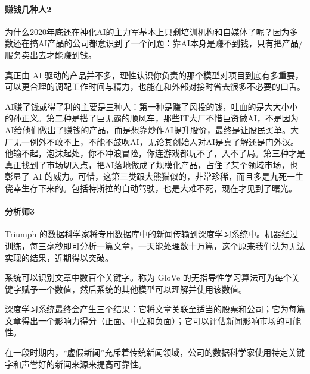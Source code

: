 \documentclass[letterpaper,11pt,english]{sphinxmanual}
\begin{document}
\paragraph{赚钱几种人2\sphinxfootnotemark[107]}
\label{\detokenize{chapter_introduction/money:id4}}%
\begin{footnotetext}[107]\sphinxAtStartFootnote
{}
%
\end{footnotetext}\ignorespaces 
为什么2020年底还在神化AI的主力军基本上只剩培训机构和自媒体了呢？因为多数还在搞AI产品的公司都意识到了一个问题：靠AI本身是赚不到钱，只有把产品/服务卖出去才能赚到钱。

真正由 AI
驱动的产品并不多，理性认识你负责的那个模型对项目到底有多重要，可以更合理的调配工作时间与精力，也能在和外部对接时省去很多不必要的口舌。

AI赚了钱或得了利的主要是三种人：第一种是赚了风投的钱，吐血的是大大小小的孙正义。第二种是搭了巨无霸的顺风车，那些IT大厂不惜巨资做AI，不是因为AI给他们做出了赚钱的产品，而是想靠炒作AI提升股价，最终是让股民买单。大厂无一例外不敢不上，不能不鼓吹AI，无论其创始人对AI是真了解还是门外汉。他输不起，泡沫起处，你不冲浪冒险，你连游戏都玩不了，入不了局。第三种才是真正找到了市场切入点，把AI落地做成了规模化产品，占住了某个领域市场，也彰显了
AI
的威力。可惜，这第三类跟大熊猫似的，非常珍稀，而且多是九死一生侥幸生存下来的。包括特斯拉的自动驾驶，也是大难不死，现在才见到了曙光。


\paragraph{分析师3\sphinxfootnotemark[108]}
\label{\detokenize{chapter_introduction/money:id5}}%
\begin{footnotetext}[108]\sphinxAtStartFootnote
{}
%
\end{footnotetext}\ignorespaces 
Triumph
的数据科学家将专用数据库中的新闻传输到深度学习系统中。机器经过训练，每三毫秒即可分析一篇文章，一天能处理数十万篇，这个原来我们认为无法实现的结果，近期得以突破。

系统可以识别文章中数百个关键字。称为 GloVe
的无指导性学习算法可为每个关键字赋予一个数值，然后系统的其他模型可以理解并使用该数值。

深度学习系统最终会产生三个结果：它将文章关联至适当的股票和公司；它为每篇文章得出一个影响力得分（正面、中立和负面）；它可以评估新闻影响市场的可能性。

在一段时期内，“虚假新闻”充斥着传统新闻领域，公司的数据科学家使用特定关键字和声誉好的新闻来源来提高可靠性。
\end{document}
